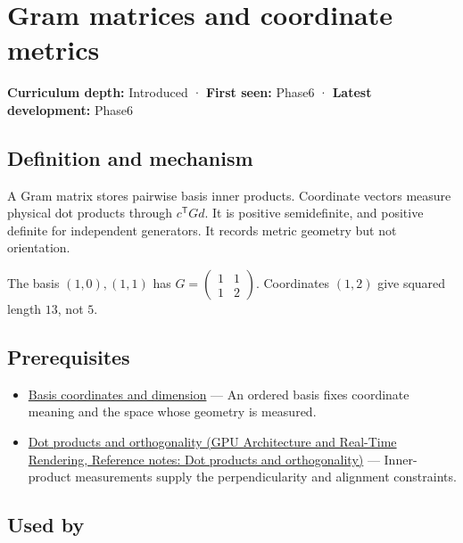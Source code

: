 \hypertarget{appendix-3b863809f82a}{}\label{referencestart:appendix-3b863809f82a}
\section{Gram matrices and coordinate metrics}\label{appendix-3b863809f82a-gram-matrices-and-coordinate-metrics}

\textbf{Curriculum depth:} Introduced · \textbf{First seen:} Phase6 · \textbf{Latest development:} Phase6

\subsection{Definition and mechanism}\label{appendix-3b863809f82a-definition-and-mechanism}

A Gram matrix stores pairwise basis inner products. Coordinate vectors measure physical dot products through \(c^\mathsf TGd\). It is positive semidefinite, and positive definite for independent generators. It records metric geometry but not orientation.

The basis \((1,0),(1,1)\) has \(G=\begin{pmatrix}1&1\\1&2\end{pmatrix}\). Coordinates \((1,2)\) give squared length \(13\), not \(5\).

\subsection{Prerequisites}\label{appendix-3b863809f82a-prerequisites}

\begin{itemize}
\tightlist
\item
  \hyperref[appendix-ce0341f7ea0d]{Basis coordinates and dimension} --- An ordered basis fixes coordinate meaning and the space whose geometry is measured.
\item
  \href{../06-GPU-Architecture-and-Real-Time-Rendering/main.pdf\#nameddest=appendix-8bc4e8fc547c}{Dot products and orthogonality (GPU Architecture and Real-Time Rendering, Reference notes: Dot products and orthogonality)} --- Inner-product measurements supply the perpendicularity and alignment constraints.
\end{itemize}

\subsection{Used by}\label{appendix-3b863809f82a-used-by}

